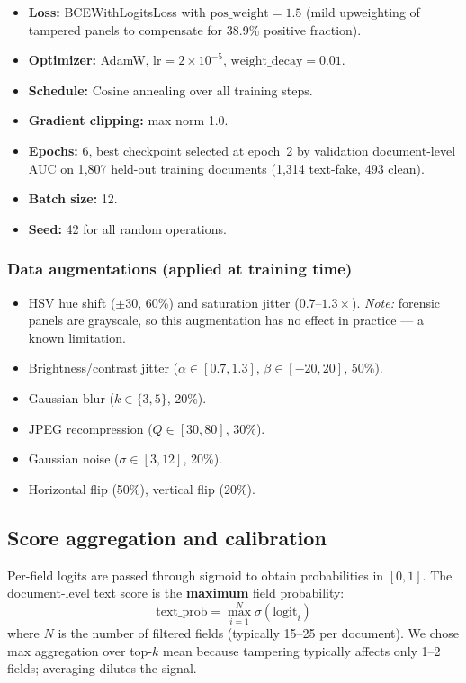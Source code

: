 \documentclass[11pt,a4paper]{article}
\begin{document}
\begin{itemize}[noitemsep]
  \item \textbf{Loss:} BCEWithLogitsLoss with $\text{pos\_weight} = 1.5$
        (mild upweighting of tampered panels to compensate for 38.9\% positive
        fraction).
  \item \textbf{Optimizer:} AdamW, $\text{lr} = 2 \times 10^{-5}$,
        $\text{weight\_decay} = 0.01$.
  \item \textbf{Schedule:} Cosine annealing over all training steps.
  \item \textbf{Gradient clipping:} max norm 1.0.
  \item \textbf{Epochs:} 6, best checkpoint selected at epoch~2 by validation
        document-level AUC on 1{,}807 held-out training documents
        (1{,}314 text-fake, 493 clean).
  \item \textbf{Batch size:} 12.
  \item \textbf{Seed:} 42 for all random operations.
\end{itemize}

\subsubsection{Data augmentations (applied at training time)}

\begin{itemize}[noitemsep]
  \item HSV hue shift ($\pm 30$, 60\%) and saturation jitter ($0.7$--$1.3\times$).
        \emph{Note:} forensic panels are grayscale, so this augmentation has no
        effect in practice --- a known limitation.
  \item Brightness/contrast jitter ($\alpha \in [0.7, 1.3]$, $\beta \in [-20, 20]$, 50\%).
  \item Gaussian blur ($k \in \{3, 5\}$, 20\%).
  \item JPEG recompression ($Q \in [30, 80]$, 30\%).
  \item Gaussian noise ($\sigma \in [3, 12]$, 20\%).
  \item Horizontal flip (50\%), vertical flip (20\%).
\end{itemize}

\subsection{Score aggregation and calibration}

Per-field logits are passed through sigmoid to obtain probabilities in $[0, 1]$.
The document-level text score is the \textbf{maximum} field probability:
\[
  \text{text\_prob} = \max_{i=1}^{N} \sigma(\text{logit}_i)
\]
where $N$ is the number of filtered fields (typically 15--25 per document).
We chose max aggregation over top-$k$ mean because tampering typically affects
only 1--2 fields; averaging dilutes the signal.
\end{document}
